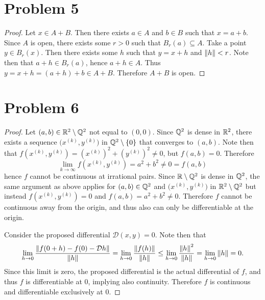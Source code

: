 \documentclass{eeleyes}
\begin{document}
\section*{Problem 5}
\begin{proof}
    Let $x \in A + B$. Then there exists $a \in A$ and $b \in B$ such that $x = a + b$. Since $A$ is open, there exists some $r > 0$ such that $B_r(a) \subseteq A$. Take a point $y \in B_r(x)$. Then there exists some $h$ such that $y = x + h$ and $\norm{h} < r$. Note then that $a + h \in B_r(a)$, hence $a + h \in A$. Thus $y = x + h = (a + h) + b \in A + B$. Therefore $A + B$ is open.
\end{proof}

\section*{Problem 6}
\begin{proof}
    Let $(a,b) \in \mathbb{R}^2 \setminus \mathbb{Q}^2$ not equal to $(0,0)$. Since $\mathbb{Q}^2$ is dense in $\mathbb{R}^2$, there exists a sequence $\bigl(x^{(k)}, y^{(k)}\bigr)$ in $\mathbb{Q}^2 \setminus \qty{0}$ that converges to $(a,b)$. Note then that $f(x^{(k)}, y^{(k)}) = (x^{(k)})^2 + (y^{(k)})^2 \neq 0$, but $f(a,b) = 0$. Therefore
    \[
        \lim_{k \to \infty} f(x^{(k)},y^{(k)}) = a^2 + b^2 \neq 0 = f(a,b)
    \]
    hence $f$ cannot be continuous at irrational pairs. Since $\mathbb{R} \setminus \mathbb{Q}^2$ is dense in $\mathbb{Q}^2$, the same argument as above applies for $(a,b) \in \mathbb{Q}^2$ and $\bigl(x^{(k)}, y^{(k)})$ in $\mathbb{R}^2 \setminus \mathbb{Q}^2$ but instead $f(x^{(k)}, y^{(k)}) = 0$ and $f(a,b) = a^2 + b^2 \neq 0$. Therefore $f$ cannot be continuous away from the origin, and thus also can only be differentiable at the origin.

    Consider the proposed differential $\mathcal{D}(x,y) = 0$. Note then that
    \[
        \lim_{h \to 0} \frac{\norm{f(0 + h) - f(0) - \mathcal{D}h}}{\norm{h}} = \lim_{h \to 0} \frac{\norm{f(h)}}{\norm{h}} \leq \lim_{h \to 0} \frac{\norm{h}^2}{\norm{h}} = \lim_{h\to 0} \norm{h} = 0
    .\]
    Since this limit is zero, the proposed differential is the actual differential of $f$, and thus $f$ is differentiable at $0$, implying also continuity. Therefore $f$ is continuous and differentiable exclusively at $0$.
\end{proof}
\end{document}
